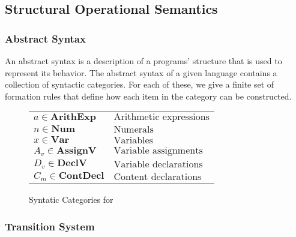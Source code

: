 \subsection{Structural Operational Semantics}

\subsubsection*{Abstract Syntax}
An abstract syntax is a description of a programs' structure that is used to represent its behavior. 
The abstract syntax of a given language contains a collection of syntactic categories. 
For each of these, we give a finite set of formation rules that define how each item in the category can be constructed.

\begin{figure}[htbp]
	\begin{center}
		\begin{tabular}{l l}
			$a \in \textbf{ArithExp}$ & $\text{Arithmetic expressions}$ \\ 
			$n \in \textbf{Num}$ & $\text{Numerals}$ \\
			$x \in \textbf{Var}$ & $\text{Variables}$ \\
			$A_v \in \textbf{AssignV}$ & $\text{Variable assignments}$ \\
			$D_v \in \textbf{DeclV}$ & $\text{Variable declarations}$ \\
			$C_m \in \textbf{ContDecl}$ & $\text{Content declarations}$
		\end{tabular}
	\end{center}
	\caption{Syntatic Categories for \dazel{}}
	\label{aaa}
\end{figure}

\subsubsection*{Transition System}